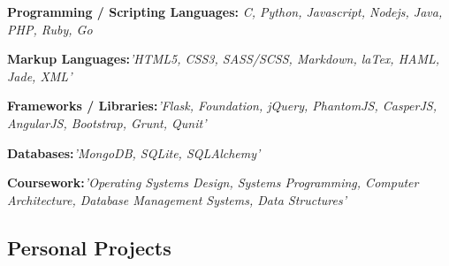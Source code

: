 \documentclass[12pt,a4paper,sans]{moderncv}        %
\begin{document}
\begin{itemize}

\item{\textbf{Programming / Scripting Languages:} \textit{C, Python, Javascript, Nodejs, Java, PHP, Ruby, Go}

\small{}}

\vspace{6pt}

\item{\textbf{Markup Languages:}\textit{'HTML5, CSS3, SASS/SCSS, Markdown, laTex, HAML, Jade, XML'}

\vspace{3pt}

\small{}}

\vspace{6pt}

\item{\textbf{Frameworks / Libraries:}\textit{'Flask, Foundation, jQuery, PhantomJS, CasperJS, AngularJS, Bootstrap, Grunt, Qunit'}

\vspace{3pt}
\item{\textbf{Databases:}\textit{'MongoDB, SQLite, SQLAlchemy'} }

\vspace{3pt}

\small{}}

\vspace{6pt}

\item{\textbf{Coursework:}\textit{'Operating Systems Design, Systems Programming, Computer Architecture, Database Management Systems, Data Structures'} }

\vspace{3pt}

\small{}

\vspace{6pt}

\end{itemize}

\vspace{5pt}

\subsection{Personal Projects}

\vspace{5pt}
\end{document}

